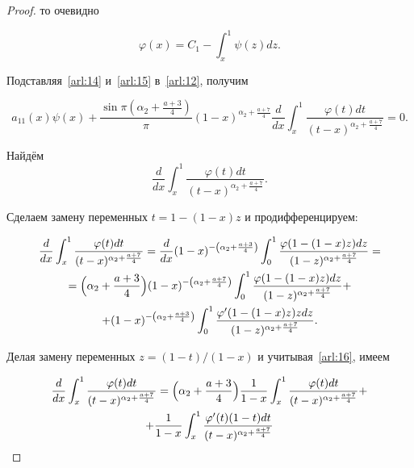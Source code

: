 \begin{proof}
то очевидно

\begin{equation}

\varphi(x)=C_1-\int_{x}^{1}\psi(z)dz.

\label{arl:16}

\end{equation}



Подставляя~\eqref{arl:14} и~\eqref{arl:15} в~\eqref{arl:12}, получим

$$a_{11}(x)\psi(x)+\frac{\sin\pi\left(\alpha_2+\frac{a+3}{4}\right)}{\pi}(1-x)^{\alpha_2+\frac{a+7}{4}}\frac{d}{dx}\int_{x}^{1}\frac{\varphi(t)dt}{(t-x)^{\alpha_2+\frac{a+7}{4}}}=0.$$



Найдём $$\frac{d}{dx}\int_{x}^{1}\frac{\varphi(t)dt}{(t-x)^{\alpha_2+\frac{a+7}{4}}}.$$ 

Сделаем замену переменных $t=1-(1-x)z$ и продифференцируем:

\begin{multline*}

\frac{d}{dx}\int_{x}^{1}\frac{\varphi(t)dt}{(t-x)^{\alpha_2+\frac{a+7}{4}}}=

\frac{d}{dx}(1-x)^{-\left(\alpha_2+\frac{a+3}{4}\right)}\int_{0}^{1}\frac{\varphi(1-(1-x)z)dz}{(1-z)^{\alpha_2+\frac{a+7}{4}}}=

\\=\Bigl(\alpha_2+\frac{a+3}{4}\Bigr)(1-x)^{-\left(\alpha_2+\frac{a+7}{4}\right)}\int_{0}^{1}\frac{\varphi(1-(1-x)z)dz}{(1-z)^{\alpha_2+\frac{a+7}{4}}}+

\\+(1-x)^{-\left(\alpha_2+\frac{a+3}{4}\right)}\int_{0}^{1}\frac{\varphi'(1-(1-x)z)zdz}{(1-z)^{\alpha_2+\frac{a+7}{4}}}.

\end{multline*}

Делая замену переменных $z=({1-t})/({1-x})$ и учитывая~\eqref{arl:16}, имеем

\begin{multline*}

\frac{d}{dx}\int_{x}^{1}\frac{\varphi(t)dt}{(t-x)^{\alpha_2+\frac{a+7}{4}}}

=\Bigl(\alpha_2+\frac{a+3}{4}\Bigr)\frac{1}{1-x}\int_{x}^{1}\frac{\varphi(t)dt}{(t-x)^{\alpha_2+\frac{a+7}{4}}}+

\\

+\frac{1}{1-x}\int_{x}^{1}\frac{\varphi'(t)(1-t)dt}{(t-x)^{\alpha_2+\frac{a+7}{4}}}


\end{multline*}
\end{proof}
